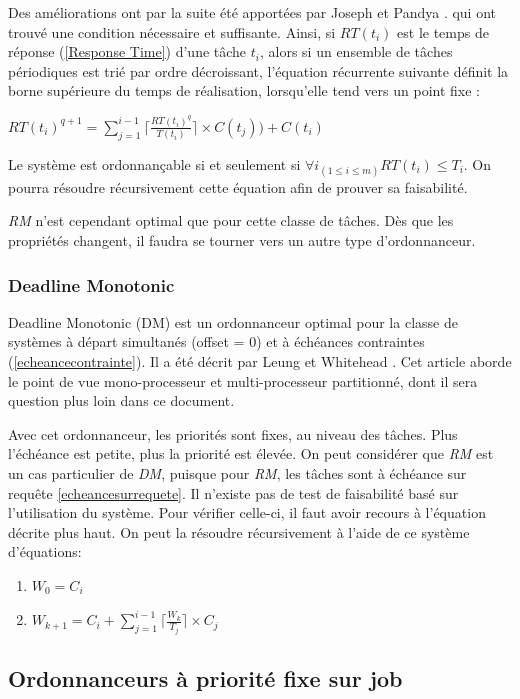 \documentclass[11pt,a4paper,oneside]{report}
\begin{document}
	Des améliorations ont par la suite été apportées par Joseph et Pandya \cite{joseph_finding_1986}.
	qui ont trouvé une condition nécessaire et suffisante. 
	Ainsi, si $RT(t_i)$ est le temps de réponse (\ref{Response Time}) d'une tâche $t_i$, 
	alors si un ensemble de tâches périodiques est trié par ordre décroissant, l'équation 
	récurrente suivante 
	définit la borne supérieure du temps de réalisation, lorsqu'elle tend vers un point fixe :
	\begin{center}
		$RT(t_i)^{q+1} = \sum_{j=1}^{i-1} \lceil \frac{RT(t_i)^q}{T(t_i)} \rceil \times C(t_j)) + C(t_i)$
	\end{center}
	Le système est ordonnançable si et seulement si $\forall i_{(1 \leq i \leq m)}RT(t_i) \leq T_i$.
	On pourra résoudre récursivement cette équation afin de prouver sa faisabilité.\medskip
	
	\textit{RM} n'est cependant optimal que pour cette classe de tâches. Dès que les propriétés changent, 
	il faudra se tourner vers un autre type d'ordonnanceur.
	
	
	\subsubsection{Deadline Monotonic}
	Deadline Monotonic (DM) est un ordonnanceur optimal pour la classe de systèmes à départ 
	simultanés (offset = 0) et à échéances contraintes
	(\ref{echeancecontrainte}). 
	Il a été décrit par Leung et Whitehead 
	\cite{leung_complexity_1982}. Cet article aborde le point de vue mono-processeur et multi-processeur partitionné, 
	dont il sera question plus loin dans ce document.\medskip
	
	Avec cet ordonnanceur, les priorités sont fixes, au niveau des tâches.
	Plus l'échéance est petite, plus la priorité est élevée. On peut considérer que \textit{RM} est 
	un cas particulier de \textit{DM}, puisque pour \textit{RM}, les tâches sont à échéance sur requête \ref{echeancesurrequete}.
	Il n'existe pas de test de faisabilité basé sur l'utilisation du système. Pour vérifier celle-ci, 
	il faut avoir recours à l'équation décrite plus haut. 
	On peut la résoudre récursivement à l'aide de ce système d'équations: \medskip
	\begin{enumerate}
		\item $W_0 = C_i $
		\item $W_{k+1} = C_i + \sum_{j = 1}^{i-1}\lceil \frac{W_k}{T_j} \rceil \times C_j $
	\end{enumerate}
	
	
	\subsection{Ordonnanceurs à priorité fixe sur job}
\end{document}
